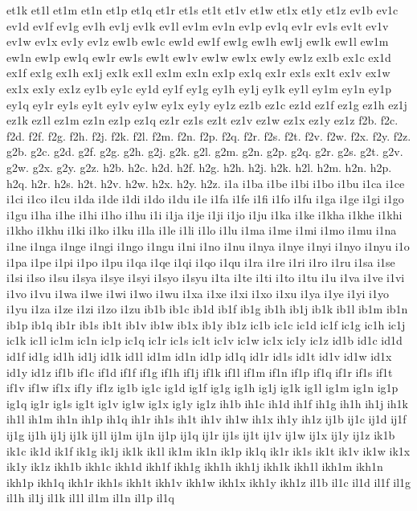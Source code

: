 {et1k
et1l
et1m
et1n
et1p
et1q
et1r
et1s
et1t
et1v
et1w
et1x
et1y
et1z
ev1b
ev1c
ev1d
ev1f
ev1g
ev1h
ev1j
ev1k
ev1l
ev1m
ev1n
ev1p
ev1q
ev1r
ev1s
ev1t
ev1v
ev1w
ev1x
ev1y
ev1z
ew1b
ew1c
ew1d
ew1f
ew1g
ew1h
ew1j
ew1k
ew1l
ew1m
ew1n
ew1p
ew1q
ew1r
ew1s
ew1t
ew1v
ew1w
ew1x
ew1y
ew1z
ex1b
ex1c
ex1d
ex1f
ex1g
ex1h
ex1j
ex1k
ex1l
ex1m
ex1n
ex1p
ex1q
ex1r
ex1s
ex1t
ex1v
ex1w
ex1x
ex1y
ex1z
ey1b
ey1c
ey1d
ey1f
ey1g
ey1h
ey1j
ey1k
ey1l
ey1m
ey1n
ey1p
ey1q
ey1r
ey1s
ey1t
ey1v
ey1w
ey1x
ey1y
ey1z
ez1b
ez1c
ez1d
ez1f
ez1g
ez1h
ez1j
ez1k
ez1l
ez1m
ez1n
ez1p
ez1q
ez1r
ez1s
ez1t
ez1v
ez1w
ez1x
ez1y
ez1z
f2b.
f2c.
f2d.
f2f.
f2g.
f2h.
f2j.
f2k.
f2l.
f2m.
f2n.
f2p.
f2q.
f2r.
f2s.
f2t.
f2v.
f2w.
f2x.
f2y.
f2z.
g2b.
g2c.
g2d.
g2f.
g2g.
g2h.
g2j.
g2k.
g2l.
g2m.
g2n.
g2p.
g2q.
g2r.
g2s.
g2t.
g2v.
g2w.
g2x.
g2y.
g2z.
h2b.
h2c.
h2d.
h2f.
h2g.
h2h.
h2j.
h2k.
h2l.
h2m.
h2n.
h2p.
h2q.
h2r.
h2s.
h2t.
h2v.
h2w.
h2x.
h2y.
h2z.
i1a
i1ba
i1be
i1bi
i1bo
i1bu
i1ca
i1ce
i1ci
i1co
i1cu
i1da
i1de
i1di
i1do
i1du
i1e
i1fa
i1fe
i1fi
i1fo
i1fu
i1ga
i1ge
i1gi
i1go
i1gu
i1ha
i1he
i1hi
i1ho
i1hu
i1i
i1ja
i1je
i1ji
i1jo
i1ju
i1ka
i1ke
i1kha
i1khe
i1khi
i1kho
i1khu
i1ki
i1ko
i1ku
i1la
i1le
i1li
i1lo
i1lu
i1ma
i1me
i1mi
i1mo
i1mu
i1na
i1ne
i1nga
i1nge
i1ngi
i1ngo
i1ngu
i1ni
i1no
i1nu
i1nya
i1nye
i1nyi
i1nyo
i1nyu
i1o
i1pa
i1pe
i1pi
i1po
i1pu
i1qa
i1qe
i1qi
i1qo
i1qu
i1ra
i1re
i1ri
i1ro
i1ru
i1sa
i1se
i1si
i1so
i1su
i1sya
i1sye
i1syi
i1syo
i1syu
i1ta
i1te
i1ti
i1to
i1tu
i1u
i1va
i1ve
i1vi
i1vo
i1vu
i1wa
i1we
i1wi
i1wo
i1wu
i1xa
i1xe
i1xi
i1xo
i1xu
i1ya
i1ye
i1yi
i1yo
i1yu
i1za
i1ze
i1zi
i1zo
i1zu
ib1b
ib1c
ib1d
ib1f
ib1g
ib1h
ib1j
ib1k
ib1l
ib1m
ib1n
ib1p
ib1q
ib1r
ib1s
ib1t
ib1v
ib1w
ib1x
ib1y
ib1z
ic1b
ic1c
ic1d
ic1f
ic1g
ic1h
ic1j
ic1k
ic1l
ic1m
ic1n
ic1p
ic1q
ic1r
ic1s
ic1t
ic1v
ic1w
ic1x
ic1y
ic1z
id1b
id1c
id1d
id1f
id1g
id1h
id1j
id1k
id1l
id1m
id1n
id1p
id1q
id1r
id1s
id1t
id1v
id1w
id1x
id1y
id1z
if1b
if1c
if1d
if1f
if1g
if1h
if1j
if1k
if1l
if1m
if1n
if1p
if1q
if1r
if1s
if1t
if1v
if1w
if1x
if1y
if1z
ig1b
ig1c
ig1d
ig1f
ig1g
ig1h
ig1j
ig1k
ig1l
ig1m
ig1n
ig1p
ig1q
ig1r
ig1s
ig1t
ig1v
ig1w
ig1x
ig1y
ig1z
ih1b
ih1c
ih1d
ih1f
ih1g
ih1h
ih1j
ih1k
ih1l
ih1m
ih1n
ih1p
ih1q
ih1r
ih1s
ih1t
ih1v
ih1w
ih1x
ih1y
ih1z
ij1b
ij1c
ij1d
ij1f
ij1g
ij1h
ij1j
ij1k
ij1l
ij1m
ij1n
ij1p
ij1q
ij1r
ij1s
ij1t
ij1v
ij1w
ij1x
ij1y
ij1z
ik1b
ik1c
ik1d
ik1f
ik1g
ik1j
ik1k
ik1l
ik1m
ik1n
ik1p
ik1q
ik1r
ik1s
ik1t
ik1v
ik1w
ik1x
ik1y
ik1z
ikh1b
ikh1c
ikh1d
ikh1f
ikh1g
ikh1h
ikh1j
ikh1k
ikh1l
ikh1m
ikh1n
ikh1p
ikh1q
ikh1r
ikh1s
ikh1t
ikh1v
ikh1w
ikh1x
ikh1y
ikh1z
il1b
il1c
il1d
il1f
il1g
il1h
il1j
il1k
il1l
il1m
il1n
il1p
il1q
}
